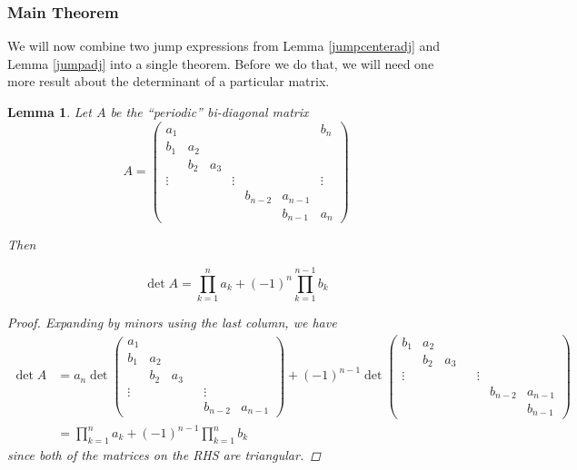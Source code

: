 \documentclass[12pt]{article}
\newtheorem{lemma}{Lemma}
\begin{document}
\subsubsection{Main Theorem}

We will now combine two jump expressions from Lemma \ref{jumpcenteradj} and Lemma \ref{jumpadj} into a single theorem. Before we do that, we will need one more result about the determinant of a particular matrix.


\begin{lemma}\label{bidiag}
Let $A$ be the ``periodic'' bi-diagonal matrix
\begin{equation}
A = \begin{pmatrix}
a_1 & & & & & & b_n \\
b_1 & a_2 \\
& b_2 & a_3 \\
\vdots & & & \vdots & &&  \vdots \\
& & & & b_{n-2} & a_{n-1} \\
& & & & & b_{n-1} & a_n
\end{pmatrix}
\end{equation}

Then 

\begin{equation}
\det{A} = \prod_{k = 1}^n a_k + (-1)^n \prod_{k = 1}^{n-1} b_k
\end{equation}

\begin{proof}
Expanding by minors using the last column, we have
\begin{align*}
\det A &= a_n \det
\begin{pmatrix}
a_1 \\
b_1 & a_2 \\
& b_2 & a_3 \\
\vdots & & & & \vdots \\
& & & & b_{n-2} & a_{n-1}
\end{pmatrix}
+ (-1)^{n-1} \det
\begin{pmatrix}
b_1 & a_2 \\
& b_2 & a_3 \\
\vdots & & & & \vdots \\
& & & & & b_{n-2} & a_{n-1} \\
& & & & & & b_{n-1}
\end{pmatrix} \\
&= \prod_{k = 1}^n a_k + (-1)^{n-1} \prod_{k = 1}^n b_k
\end{align*}
since both of the matrices on the RHS are triangular.
\end{proof}
\end{lemma}
\end{document}
